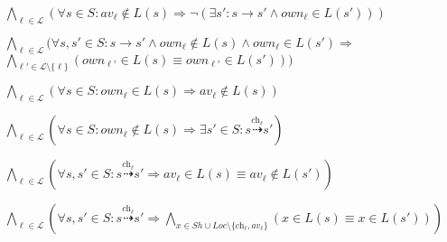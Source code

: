\begin{description}[font=\normalfont]
	\item[P1.] $\bigwedge_{\ell \in \mathcal{L}}(\forall s \in S :  \textit{av}_\ell \notin L(s) \Rightarrow \neg (\exists s' : s \rightarrow s' \wedge \textit{own}_\ell \in L(s')))$
	\item[P2.] $\bigwedge_{\ell \in \mathcal{L}}(\forall s,s' \in S : s \rightarrow s' \wedge \textit{own}_\ell \notin L(s) \wedge \textit{own}_\ell \in L(s') \Rightarrow$\\
			\hspace*{5cm}  $\bigwedge_{\ell' \in \mathcal{L}\setminus\{\ell\}} (own_{\ell'} \in L(s) \equiv \textit{own}_{\ell'} \in L(s')))$
	\item[P3.] $\bigwedge_{\ell \in \mathcal{L}}(\forall s \in S: \textit{own}_\ell \in L(s) \Rightarrow   \textit{av}_\ell \notin L(s))$
	\item[P4.] $\bigwedge_{\ell \in \mathcal{L}}(\forall s \in S : \textit{own}_\ell \notin L(s) \Rightarrow \exists s' \in S : s \overset{\textit{ch}_\ell}{\dashrightarrow} s')$
	\item[P5.] $\bigwedge_{\ell \in \mathcal{L}}(\forall s,s' \in S : s \overset{\textit{ch}_\ell}{\dashrightarrow}{s'} \Rightarrow \textit{av}_\ell \in L(s) \equiv  \textit{av}_\ell \notin L(s'))$ 	
	\item[P6.] $\bigwedge_{\ell \in \mathcal{L}}(\forall  s,s' \in S : s \overset{\textit{ch}_\ell}{\dashrightarrow} s' \Rightarrow \bigwedge_{x \in Sh \cup Loc \setminus \{\textit{ch}_\ell, \textit{av}_\ell\}}(x \in L(s) \equiv x \in L(s')))$


\end{description}

